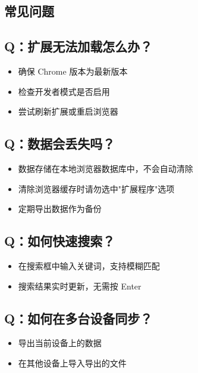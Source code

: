 \documentclass[10pt,a4paper]{article}
\begin{document}
\begin{itemize}
\begin{itemize}
\begin{itemize}
\vspace{5pt}

\section{常见问题}

\subsection{Q：扩展无法加载怎么办？}
\begin{itemize}
  \item 确保 Chrome 版本为最新版本
  \item 检查开发者模式是否启用
  \item 尝试刷新扩展或重启浏览器
\end{itemize}

\subsection{Q：数据会丢失吗？}
\begin{itemize}
  \item 数据存储在本地浏览器数据库中，不会自动清除
  \item 清除浏览器缓存时请勿选中"扩展程序"选项
  \item 定期导出数据作为备份
\end{itemize}

\subsection{Q：如何快速搜索？}
\begin{itemize}
  \item 在搜索框中输入关键词，支持模糊匹配
  \item 搜索结果实时更新，无需按 Enter
\end{itemize}

\subsection{Q：如何在多台设备同步？}
\begin{itemize}
  \item 导出当前设备上的数据
  \item 在其他设备上导入导出的文件
\end{itemize}

\vspace{5pt}


\end{itemize}
\end{itemize}
\end{itemize}
\end{document}
